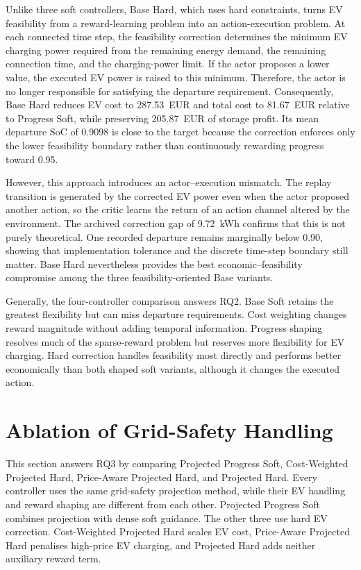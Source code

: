 Unlike three soft controllers, Base Hard, which uses hard constraints, turns EV feasibility from a reward-learning problem into an action-execution problem. At each connected time step, the feasibility correction determines the minimum EV charging power required from the remaining energy demand, the remaining connection time, and the charging-power limit. If the actor proposes a lower value, the executed EV power is raised to this minimum. Therefore, the actor is no longer responsible for satisfying the departure requirement. Consequently, Base Hard reduces EV cost to 287.53~EUR and total cost to 81.67~EUR relative to Progress Soft, while preserving 205.87~EUR of storage profit. Its mean departure SoC of 0.9098 is close to the target because the correction enforces only the lower feasibility boundary rather than continuously rewarding progress toward 0.95. 

However, this approach introduces an actor--execution mismatch. The replay transition is generated by the corrected EV power even when the actor proposed another action, so the critic learns the return of an action channel altered by the environment. The archived correction gap of 9.72~kWh confirms that this is not purely theoretical. One recorded departure remains marginally below 0.90, showing that implementation tolerance and the discrete time-step boundary still matter. Base Hard nevertheless provides the best economic--feasibility compromise among the three feasibility-oriented Base variants.

Generally, the four-controller comparison answers RQ2. Base Soft retains the greatest flexibility but can miss departure requirements. Cost weighting changes reward magnitude without adding temporal information. Progress shaping resolves much of the sparse-reward problem but reserves more flexibility for EV charging. Hard correction handles feasibility most directly and performs better economically than both shaped soft variants, although it changes the executed action.

\section{Ablation of Grid-Safety Handling}\label{section:madrl-hard-results}

This section answers RQ3 by comparing Projected Progress Soft, Cost-Weighted Projected Hard, Price-Aware Projected Hard, and Projected Hard. Every controller uses the same grid-safety projection method, while their EV handling and reward shaping are different from each other. Projected Progress Soft combines projection with dense soft guidance. The other three use hard EV correction. Cost-Weighted Projected Hard scales EV cost, Price-Aware Projected Hard penalises high-price EV charging, and Projected Hard adds neither auxiliary reward term. 

